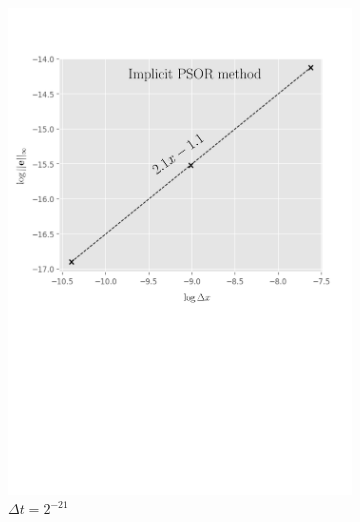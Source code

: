 \begin{figure}[tbp]
  \centering
  \begin{subfigure}{0.4\textwidth}
    \centering
    \includegraphics[width=\textwidth]{chapters/chapter5/ConvergenceSpaceImplicitLCP.pdf}
    \caption{$\Delta{x}=2^{-7},\dots,2^{-10}$}
    \caption*{$\Delta{t}=2^{-21}$}
    \label{fig:lcp:numericalresults:convergence_space_implicit}
  \end{subfigure}
  \hspace{0.5cm}
  \begin{subfigure}{0.4\textwidth}
    \centering

\end{subfigure}
\end{figure}
